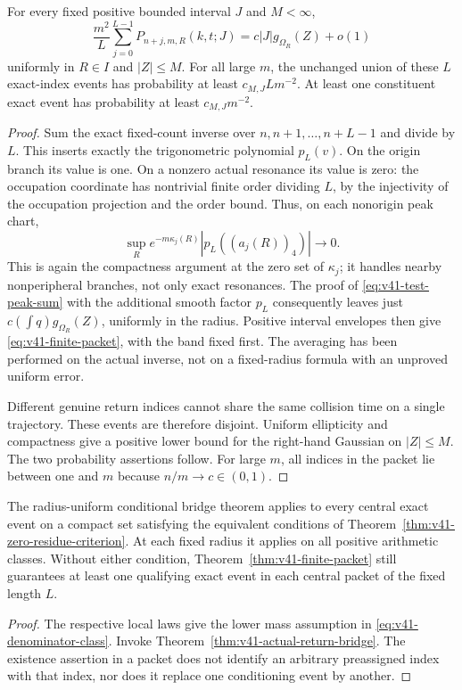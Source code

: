 \begin{theorem}
\label{thm:v41-finite-packet}
For every fixed positive bounded interval $J$ and $M<\infty$,
\begin{equation}\label{eq:v41-finite-packet}
 \frac{m^2}{L}\sum_{j=0}^{L-1}P_{n+j,m,R}(k,t;J)
        =c|J|g_{\Omega_R}(Z)+o(1)
\end{equation}
uniformly in $R\in I$ and $|Z|\le M$. For all large $m$, the unchanged
union of these $L$ exact-index events has probability at least
$c_{M,J}L m^{-2}$. At least one constituent exact event has probability
at least $c_{M,J}m^{-2}$.
\end{theorem}
\begin{proof}
Sum the exact fixed-count inverse over $n,n+1,\ldots,n+L-1$ and divide
by $L$. This inserts exactly the trigonometric polynomial $p_L(v)$.
On the origin branch its value is one. On a nonzero actual resonance
its value is zero: the occupation coordinate has nontrivial finite
order dividing $L$, by the injectivity of the occupation projection
and the order bound. Thus, on each nonorigin peak chart,
\[
 \sup_R e^{-m\kappa_j(R)}|p_L((a_j(R))_4)|\longrightarrow0.
\]
This is again the compactness argument at the zero set of $\kappa_j$;
it handles nearby nonperipheral branches, not only exact resonances.
The proof of \eqref{eq:v41-test-peak-sum} with the additional smooth
factor $p_L$ consequently leaves just
$c(\int q)g_{\Omega_R}(Z)$, uniformly in the radius. Positive interval
envelopes then give \eqref{eq:v41-finite-packet}, with the band fixed
first. The averaging has been performed on the actual inverse, not
on a fixed-radius formula with an unproved uniform error.

Different genuine return indices cannot share the same collision
time on a single trajectory. These events are therefore disjoint.
Uniform ellipticity and compactness give a positive lower bound for
the right-hand Gaussian on $|Z|\le M$. The two probability assertions
follow. For large $m$, all indices in the packet lie between one and
$m$ because $n/m\to c\in(0,1)$.
\end{proof}

\begin{corollary}
\label{cor:v41-bridge-denominators}
The radius-uniform conditional bridge theorem applies to every central
exact event on a compact set satisfying the equivalent conditions of
Theorem~\ref{thm:v41-zero-residue-criterion}. At each fixed radius it
applies on all positive arithmetic classes. Without either condition,
Theorem~\ref{thm:v41-finite-packet} still guarantees at least one
qualifying exact event in each central packet of the fixed length $L$.
\end{corollary}
\begin{proof}
The respective local laws give the lower mass assumption in
\eqref{eq:v41-denominator-class}. Invoke
Theorem~\ref{thm:v41-actual-return-bridge}. The existence assertion in
a packet does not identify an arbitrary preassigned index with that
index, nor does it replace one conditioning event by another.
\end{proof}

